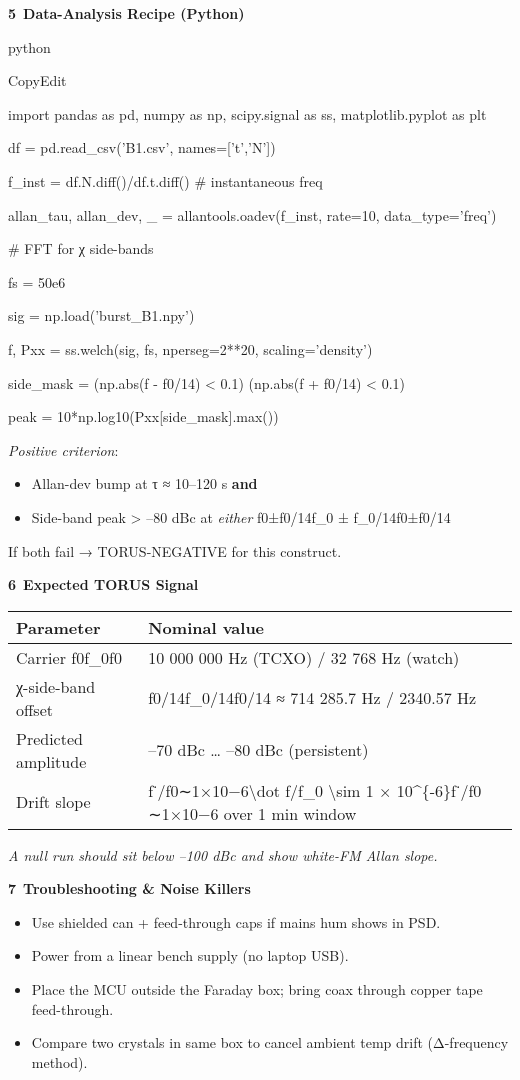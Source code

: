 \documentclass[]{article}
\begin{document}
\textbf{5 Data-Analysis Recipe (Python)}

python

CopyEdit

import pandas as pd, numpy as np, scipy.signal as ss, matplotlib.pyplot
as plt

df = pd.read\_csv('B1.csv', names={[}'t','N'{]})

f\_inst = df.N.diff()/df.t.diff() \# instantaneous freq

allan\_tau, allan\_dev, \_ = allantools.oadev(f\_inst, rate=10,
data\_type='freq')

\# FFT for χ side-bands

fs = 50e6

sig = np.load('burst\_B1.npy')

f, Pxx = ss.welch(sig, fs, nperseg=2**20, scaling='density')

side\_mask = (np.abs(f - f0/14) \textless{} 0.1) \textbar{} (np.abs(f +
f0/14) \textless{} 0.1)

peak = 10*np.log10(Pxx{[}side\_mask{]}.max())

\emph{Positive criterion}:

\begin{itemize}
\item
  Allan-dev bump at τ ≈ 10--120 s \textbf{and}
\item
  Side-band peak \textgreater{} --80 dBc at \emph{either} f0±f0/14f\_0 ±
  f\_0/14f0​±f0​/14
\end{itemize}

If both fail → TORUS-NEGATIVE for this construct.

\textbf{6 Expected TORUS Signal}

\begin{longtable}[]{@{}ll@{}}
\toprule
\textbf{Parameter} & \textbf{Nominal value}\tabularnewline
\midrule
\endhead
Carrier f0f\_0f0​ & 10 000 000 Hz (TCXO) / 32 768 Hz
(watch)\tabularnewline
χ-side-band offset & f0/14f\_0/14f0​/14 ≈ 714 285.7 Hz / 2340.57
Hz\tabularnewline
Predicted amplitude & --70 dBc \ldots{} --80 dBc
(persistent)\tabularnewline
Drift slope & f˙/f0∼1×10−6\textbackslash{}dot f/f\_0 \textbackslash{}sim
1 × 10\^{}\{-6\}f˙​/f0​∼1×10−6 over 1 min window\tabularnewline
\bottomrule
\end{longtable}

\emph{A null run should sit below --100 dBc and show white-FM Allan
slope.}

\textbf{7 Troubleshooting \& Noise Killers}

\begin{itemize}
\item
  Use shielded can + feed-through caps if mains hum shows in PSD.
\item
  Power from a linear bench supply (no laptop USB).
\item
  Place the MCU outside the Faraday box; bring coax through copper tape
  feed-through.
\item
  Compare two crystals in same box to cancel ambient temp drift
  (Δ-frequency method).
\end{itemize}
\end{document}

